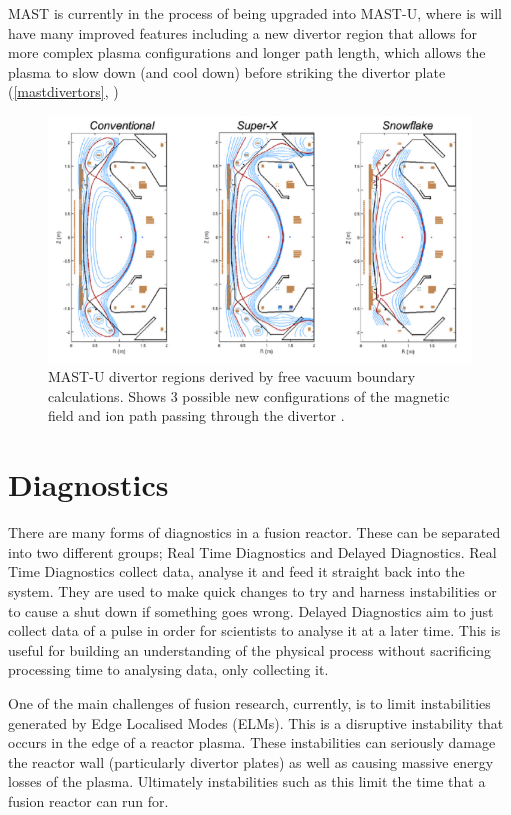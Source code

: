 \documentclass[12pt,a4paper,oneside]{report}
\begin{document}
MAST is currently in the process of being upgraded into MAST-U, where is will have many improved features including a new divertor region that allows for more complex plasma configurations and longer path length, which allows the plasma to slow down (and cool down) before striking the divertor plate (\autoref{mastdivertors}, \cite{CulhamCenterforFusionEnergyResearch:Upgrade})

\begin{figure}[H]
\includegraphics[width=1\textwidth, center,angle=0]{Images/MASTUdivertors}
\caption{MAST-U divertor regions derived by free vacuum boundary calculations. Shows 3 possible new configurations of the magnetic field and ion path passing through the divertor \cite{CulhamCenterforFusionEnergyResearch:Upgrade}.}
\label{mastdivertors}
\end{figure}

	\section{Diagnostics}
There are many forms of diagnostics in a fusion reactor. These can be separated into two different groups; Real Time Diagnostics and Delayed Diagnostics. Real Time Diagnostics collect data, analyse it and feed it straight back into the system. They are used to make quick changes to try and harness instabilities or to cause a shut down if something goes wrong. Delayed Diagnostics aim to just collect data of a pulse in order for scientists to analyse it at a later time. This is useful for building an understanding of the physical process without sacrificing processing time to analysing data, only collecting it. 
\medskip

One of the main challenges of fusion research, currently, is to limit instabilities generated by Edge Localised Modes (ELMs). This is a disruptive instability that occurs in the edge of a reactor plasma. These instabilities can seriously damage the reactor wall (particularly divertor plates) as well as causing massive energy losses of the plasma. Ultimately instabilities such as this limit the time that a fusion reactor can run for.
	
\end{document}
